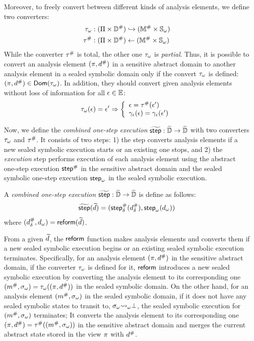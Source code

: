 Moreover, to freely convert between different kinds of analysis elements, we define two converters:
\begin{align}
  {\tau}_\omega & : (\Pi \times {\mathbb{D}}^{\#}) \hookrightarrow
    ({\mathbb{M}}^{\#} \times {\mathbb{S}}_\omega)\\
  {\tau}^{\#} & : (\Pi \times
    {\mathbb{D}}^{\#}) \leftarrow ({\mathbb{M}}^{\#} \times {\mathbb{S}}_\omega)
\end{align}
While the converter ${\tau}^{\#}$ is total, the other one ${\tau}_\omega$ is
\textit{partial}. Thus, it is possible to convert an analysis element
$(\pi, {d}^{\#})$ in a sensitive abstract domain to another analysis element in
a sealed symbolic domain only if the convert ${\tau}_\omega$ is defined: $(\pi,
{d}^{\#}) \in \textsf{Dom}({\tau}_\omega)$.  In addition, they should convert given
analysis elements without loss of information for all $\epsilon \in \mathbb{E}$:
\[
  {\tau}_\omega(\epsilon) = \epsilon' \Rightarrow \left\{
  \begin{array}{l}
    \epsilon = {\tau}^{\#}(\epsilon')\\
    \gamma_{\epsilon}(\epsilon) = \gamma_{\epsilon}(\epsilon')\\
  \end{array}
  \right.
\]

Now, we define the \textit{combined one-step execution} $\widetilde{\textsf{step}}: \widetilde{\mathbb{D}}
\rightarrow \widetilde{\mathbb{D}}$ with two converters ${\tau}_\omega$ and ${\tau}^{\#}$.
It consists of two steps: 1) the \textit{\triagename} step converts
analysis elements if a new sealed symbolic execution starts or an
existing one stops, and 2) the \textit{execution} step performs execution of each
analysis element using the abstract one-step execution ${\textsf{step}}^{\#}$ in the sensitive
abstract domain and the sealed symbolic one-step execution ${\textsf{step}}_\omega$ in the sealed
symbolic execution.
\begin{definition}
A \textit{combined one-step execution} $\widetilde{\textsf{step}}: \widetilde{\mathbb{D}} \rightarrow
\widetilde{\mathbb{D}}$ is define as follows:
  \[
    \widetilde{\textsf{step}}(\widetilde{d}) = ({\textsf{step}}^{\#}_\delta({{d}^{\#}_\delta}), {\textsf{step}}_\omega({d}_\omega))
  \]
where $({{d}^{\#}_\delta}, {d}_\omega) = \textsf{reform}(\widetilde{d})$.
\end{definition}

From a given $\widetilde{d}$, the $\textsf{reform}$ function makes analysis elements
and converts them if a new sealed symbolic execution
begins or an existing sealed symbolic execution terminates.
Specifically, for an analysis element $(\pi, {d}^{\#})$ in the sensitive abstract domain,
if the converter ${\tau}_\omega$ is defined for it, $\textsf{reform}$ introduces a new sealed symbolic execution
by converting the analysis element to its corresponding one $({m}^{\#}, {\sigma}_\omega) =
{\tau}_\omega((\pi, {d}^{\#}))$ in the sealed symbolic domain.
On the other hand, for an analysis element $({m}^{\#}, {\sigma}_\omega)$ in the sealed symbolic domain,
if it does not have any sealed symbolic states to transit to, ${\sigma}_\omega {\leadsto}_\omega \bot$,
the sealed symbolic execution for $({m}^{\#}, {\sigma}_\omega)$ terminates;
It converts the analysis element to its corresponding one $(\pi, {d}^{\#}) =
{\tau}^{\#}(({m}^{\#}, {\sigma}_\omega))$ in the sensitive abstract domain and
merges the current abstract state stored in the view $\pi$ with ${d}^{\#}$.

